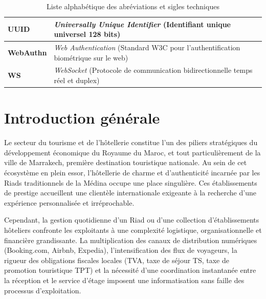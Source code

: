 \documentclass[12pt,a4paper,oneside]{report}
\begin{document}
\begin{table}[H]
\begin{tabularx}{\textwidth}{|p{3.5cm}|X|}
\hline
\textbf{UUID} & \textit{Universally Unique Identifier} (Identifiant unique universel 128 bits) \\
\hline
\textbf{WebAuthn} & \textit{Web Authentication} (Standard W3C pour l'authentification biométrique sur le web) \\
\hline
\textbf{WS} & \textit{WebSocket} (Protocole de communication bidirectionnelle temps réel et duplex) \\
\hline
\end{tabularx}
\caption{Liste alphabétique des abréviations et sigles techniques}
\label{tab:glossaire_abbrev}
\end{table}

\clearpage

\listoffigures
{}
\clearpage

\listoftables
{}
\clearpage

\tableofcontents
\clearpage

\setcounter{page}{1}

\chapter*{Introduction générale}

Le secteur du tourisme et de l'hôtellerie constitue l'un des piliers stratégiques du développement économique du Royaume du Maroc, et tout particulièrement de la ville de Marrakech, première destination touristique nationale. Au sein de cet écosystème en plein essor, l'hôtellerie de charme et d'authenticité incarnée par les Riads traditionnels de la Médina occupe une place singulière. Ces établissements de prestige accueillent une clientèle internationale exigeante à la recherche d'une expérience personnalisée et irréprochable.

Cependant, la gestion quotidienne d'un Riad ou d'une collection d'établissements hôteliers confronte les exploitants à une complexité logistique, organisationnelle et financière grandissante. La multiplication des canaux de distribution numériques (Booking.com, Airbnb, Expedia), l'intensification des flux de voyageurs, la rigueur des obligations fiscales locales (TVA, taxe de séjour TS, taxe de promotion touristique TPT) et la nécessité d'une coordination instantanée entre la réception et le service d'étage imposent une informatisation sans faille des processus d'exploitation.
\end{document}
